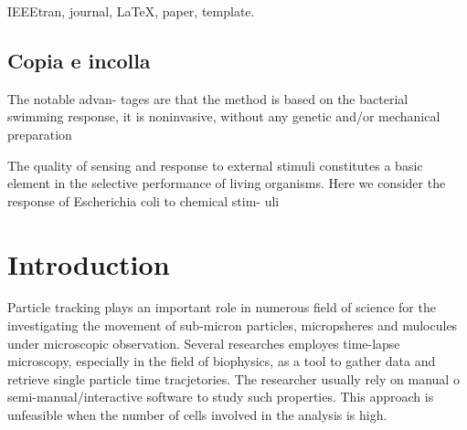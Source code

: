 \documentclass[conference]{IEEEtran}
\begin{document}
\maketitle


\begin{abstract}

\end{abstract}

\begin{IEEEkeywords}
IEEEtran, journal, \LaTeX, paper, template.
\end{IEEEkeywords}






%
\IEEEpeerreviewmaketitle

\subsection{Copia e incolla}
The notable advan-
tages are that the method is based on the bacterial swimming
response, it is noninvasive, without any genetic and/or mechanical
preparation

The quality of sensing and response to external stimuli constitutes
a basic element in the selective performance of living organisms.
Here we consider the response of Escherichia coli to chemical stim-
uli
\section{Introduction}
Particle tracking plays an important role in numerous field of science for the investigating the movement of sub-micron particles, micropsheres and mulocules under microscopic observation.  Several researches employes time-lapse microscopy, especially in the field of biophysics, as a tool to gather data and retrieve single particle time tracjetories. The researcher usually rely on manual o semi-manual/interactive software to study such properties. This approach is unfeasible when the number of cells involved in the analysis is high.
\end{document}
